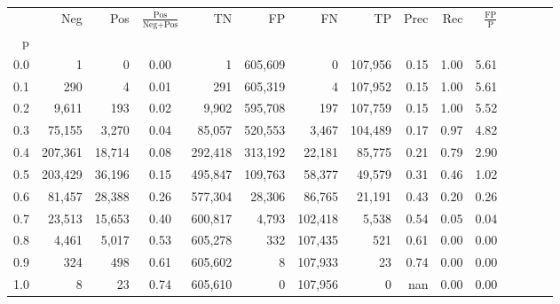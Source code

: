 \begin{tabular}{rrrcrrrrrrrrrrr}
\toprule
{} &      Neg &     Pos & $\frac{\text{Pos}}{\text{Neg}+\text{Pos}}$ &       TN &       FP &       FN &       TP &  Prec &   Rec & $\frac{\text{FP}}{\text{P}}$ \\
p   &          &         &                                            &          &          &          &          &       &       &                              \\
\midrule
0.0 &        1 &       0 &                                       0.00 &        1 &  605,609 &        0 &  107,956 &  0.15 &  1.00 &                         5.61 \\
0.1 &      290 &       4 &                                       0.01 &      291 &  605,319 &        4 &  107,952 &  0.15 &  1.00 &                         5.61 \\
0.2 &    9,611 &     193 &                                       0.02 &    9,902 &  595,708 &      197 &  107,759 &  0.15 &  1.00 &                         5.52 \\
0.3 &   75,155 &   3,270 &                                       0.04 &   85,057 &  520,553 &    3,467 &  104,489 &  0.17 &  0.97 &                         4.82 \\
0.4 &  207,361 &  18,714 &                                       0.08 &  292,418 &  313,192 &   22,181 &   85,775 &  0.21 &  0.79 &                         2.90 \\
0.5 &  203,429 &  36,196 &                                       0.15 &  495,847 &  109,763 &   58,377 &   49,579 &  0.31 &  0.46 &                         1.02 \\
0.6 &   81,457 &  28,388 &                                       0.26 &  577,304 &   28,306 &   86,765 &   21,191 &  0.43 &  0.20 &                         0.26 \\
0.7 &   23,513 &  15,653 &                                       0.40 &  600,817 &    4,793 &  102,418 &    5,538 &  0.54 &  0.05 &                         0.04 \\
0.8 &    4,461 &   5,017 &                                       0.53 &  605,278 &      332 &  107,435 &      521 &  0.61 &  0.00 &                         0.00 \\
0.9 &      324 &     498 &                                       0.61 &  605,602 &        8 &  107,933 &       23 &  0.74 &  0.00 &                         0.00 \\
1.0 &        8 &      23 &                                       0.74 &  605,610 &        0 &  107,956 &        0 &   nan &  0.00 &                         0.00 \\
\bottomrule
\end{tabular}
